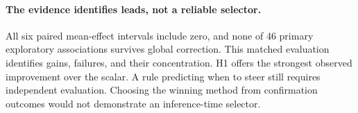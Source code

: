 \paragraph{The evidence identifies leads, not a reliable selector.}
All six paired mean-effect intervals include zero, and none of 46 primary exploratory associations survives global correction. This matched evaluation identifies gains, failures, and their concentration. H1 offers the strongest observed improvement over the scalar. A rule predicting when to steer still requires independent evaluation. Choosing the winning method from confirmation outcomes would not demonstrate an inference-time selector.
